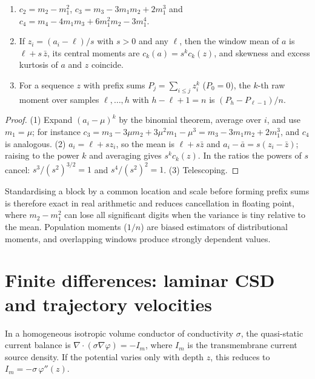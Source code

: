 \begin{theorem}\label{ars:mom-001}
\begin{enumerate}[leftmargin=2em]
\item $c_2=m_2-m_1^2$, $c_3=m_3-3m_1m_2+2m_1^3$ and $c_4=m_4-4m_1m_3+6m_1^2m_2-3m_1^4$.
\item If $z_i=(a_i-\ell)/s$ with $s>0$ and any $\ell$, then the window mean of $a$ is $\ell+s\,\bar z$, its central moments are $c_k(a)=s^kc_k(z)$, and skewness and excess kurtosis of $a$ and $z$ coincide.
\item For a sequence $z$ with prefix sums $P_j=\sum_{i\le j}z_i^k$ ($P_0=0$), the $k$-th raw moment over samples $\ell,\dots,h$ with $h-\ell+1=n$ is $(P_h-P_{\ell-1})/n$.
\end{enumerate}
\end{theorem}
\begin{proof}
(1) Expand $(a_i-\mu)^k$ by the binomial theorem, average over $i$, and use $m_1=\mu$; for instance $c_3=m_3-3\mu m_2+3\mu^2m_1-\mu^3=m_3-3m_1m_2+2m_1^3$, and $c_4$ is analogous. (2) $a_i=\ell+sz_i$, so the mean is $\ell+s\bar z$ and $a_i-\bar a=s(z_i-\bar z)$; raising to the power $k$ and averaging gives $s^kc_k(z)$. In the ratios the powers of $s$ cancel: $s^3/(s^2)^{3/2}=1$ and $s^4/(s^2)^2=1$. (3) Telescoping.
\end{proof}
Standardising a block by a common location and scale before forming prefix sums is therefore exact in real arithmetic and reduces cancellation in floating point, where $m_2-m_1^2$ can lose all significant digits when the variance is tiny relative to the mean. Population moments ($1/n$) are biased estimators of distributional moments, and overlapping windows produce strongly dependent values.

\section{Finite differences: laminar CSD and trajectory velocities}
In a homogeneous isotropic volume conductor of conductivity $\sigma$, the quasi-static current balance is $\nabla\cdot(\sigma\nabla\varphi)=-I_m$, where $I_m$ is the transmembrane current source density. If the potential varies only with depth $z$, this reduces to $I_m=-\sigma\,\varphi''(z)$.

